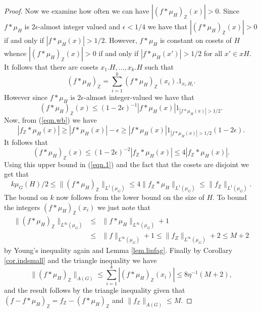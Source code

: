 \documentclass[12pt]{amsart}
\numberwithin{equation}{section}
\theoremstyle{plain}
\theoremstyle{definition}
\renewcommand{\leq}{\leqslant}
\renewcommand{\geq}{\geqslant}
\newcommand{\Z}{\mathbb{Z}}
\begin{document}
\begin{proof}
Now we examine how often we can have $|(f \ast \mu_H)_{\Z}(x)|>0$.  Since $f \ast \mu_H$ is $2\epsilon$-almost integer valued and $\epsilon<1/4$ we have that $|(f \ast \mu_H)_{\Z}(x)|>0$ if and only if $|f \ast \mu_H(x)|>1/2$.  However, $f \ast \mu_H$ is constant on cosets of $H$ whence $|(f \ast \mu_H)_{\Z}(x)|>0$ if and only if $|f \ast \mu_H(x')|>1/2$ for all $x' \in xH$. It follows that there are cosets $x_1.H,\dots,x_k.H$ such that
\begin{equation}\label{eqn.1}
(f \ast \mu_H)_{\Z}=\sum_{i=1}^k{(f \ast \mu_H)_\Z(x_i).1_{x_i.H_i}}.
\end{equation}
However since $f \ast \mu_H$ is $2\epsilon$-almost integer-valued we have that
\begin{equation*}
(f \ast \mu_H)_{\Z}(x) \leq (1-2\epsilon)^{-1}|f \ast \mu_H(x)|1_{|f \ast \mu_H(x)|>1/2}.
\end{equation*}
Now, from (\ref{eqn.wb}) we have
\begin{equation*}
|f_\Z\ast \mu_H(x)| \geq |f \ast \mu_H(x)| - \epsilon \geq |f \ast \mu_H(x)|1_{|f \ast \mu_H(x)|>1/2}(1-2\epsilon).
\end{equation*}
It follows that
\begin{equation*}
(f \ast \mu_H)_{\Z}(x) \leq (1-2\epsilon)^{-2}|f_\Z\ast \mu_H(x)| \leq 4|f_\Z\ast \mu_H(x)| .
\end{equation*}
Using this upper bound in (\ref{eqn.1}) and the fact that the cosets are disjoint we get that
\begin{equation*}
k\mu_G(H)/2 \leq \|(f \ast \mu_H)_{\Z}\|_{L^1(\mu_G)} \leq 4\|f_\Z\ast \mu_H\|_{L^1(\mu_G)} \leq \|f_\Z\|_{L^1(\mu_G)}.
\end{equation*}
The bound on $k$ now follows from the lower bound on the size of $H$.  To bound the integers $(f \ast \mu_H)_\Z(x_i)$ we just note that
\begin{eqnarray*}
\|(f \ast \mu_H)_{\Z}\|_{L^\infty(\mu_G)}& \leq& \|f\ast \mu_H\|_{L^\infty(\mu_G)} + 1\\& \leq & \|f\|_{L^\infty(\mu_G)}+1 \leq \|f_Z\|_{L^\infty(\mu_G)} + 2 \leq M+2
\end{eqnarray*}
by Young's inequality again and Lemma \ref{lem.linfag}.  Finally by Corollary \ref{cor.indsmall} and the triangle inequality we have
\begin{equation*}
\|(f \ast \mu_H)_{\Z}\|_{A(G)} \leq \sum_{i=1}^k{|(f \ast \mu_H)_\Z(x_i)|} \leq 8\eta^{-1}(M+2),
\end{equation*}
and the result follows by the triangle inequality given that $(f-f\ast \mu_H)_\Z = f_\Z - (f\ast\mu_H)_\Z$ and $\|f_\Z\|_{A(G)} \leq M$.
\end{proof}
\end{document}

